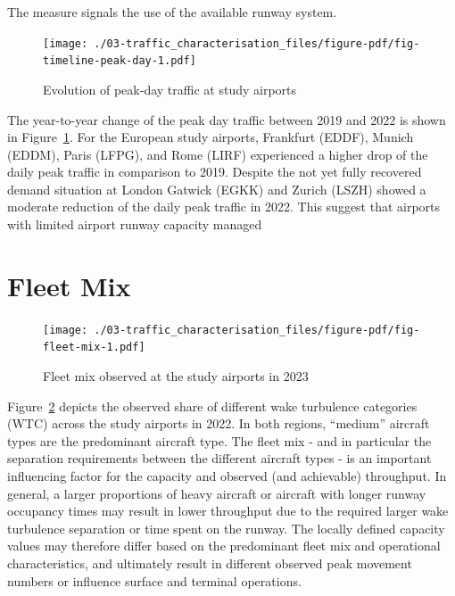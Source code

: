 \documentclass[
  a4paper,
  DIV=11,
  numbers=noendperiod]{scrreport}
\begin{document}
The measure signals the use of the available runway system.

\begin{figure}[H]

{\centering \texttt{[image: ./03-traffic\_characterisation\_files/figure-pdf/fig-timeline-peak-day-1.pdf]}

}

\caption{\label{fig-timeline-peak-day}Evolution of peak-day traffic at
study airports}

\end{figure}

The year-to-year change of the peak day traffic between 2019 and 2022 is
shown in Figure~\ref{fig-timeline-peak-day}. For the European study
airports, Frankfurt (EDDF), Munich (EDDM), Paris (LFPG), and Rome (LIRF)
experienced a higher drop of the daily peak traffic in comparison to
2019. Despite the not yet fully recovered demand situation at London
Gatwick (EGKK) and Zurich (LSZH) showed a moderate reduction of the
daily peak traffic in 2022. This suggest that airports with limited
airport runway capacity managed

\hypertarget{fleet-mix}{%
\section{Fleet Mix}\label{fleet-mix}}

\begin{figure}[H]

{\centering \texttt{[image: ./03-traffic\_characterisation\_files/figure-pdf/fig-fleet-mix-1.pdf]}

}

\caption{\label{fig-fleet-mix}Fleet mix observed at the study airports
in 2023}

\end{figure}

Figure~\ref{fig-fleet-mix} depicts the observed share of different wake
turbulence categories (WTC) across the study airports in 2022. In both
regions, ``medium'' aircraft types are the predominant aircraft type.
The fleet mix - and in particular the separation requirements between
the different aircraft types - is an important influencing factor for
the capacity and observed (and achievable) throughput. In general, a
larger proportions of heavy aircraft or aircraft with longer runway
occupancy times may result in lower throughput due to the required
larger wake turbulence separation or time spent on the runway. The
locally defined capacity values may therefore differ based on the
predominant fleet mix and operational characteristics, and ultimately
result in different observed peak movement numbers or influence surface
and terminal operations.
\end{document}
